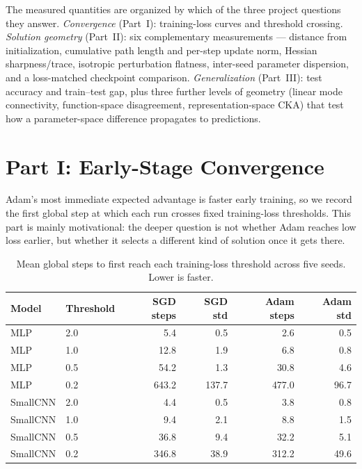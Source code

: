 \documentclass[11pt]{article}
\begin{document}
The measured quantities are organized by which of the three project questions they answer. \emph{Convergence} (Part~I): training-loss curves and threshold crossing. \emph{Solution geometry} (Part~II): six complementary measurements --- distance from initialization, cumulative path length and per-step update norm, Hessian sharpness/trace, isotropic perturbation flatness, inter-seed parameter dispersion, and a loss-matched checkpoint comparison. \emph{Generalization} (Part~III): test accuracy and train--test gap, plus three further levels of geometry (linear mode connectivity, function-space disagreement, representation-space CKA) that test how a parameter-space difference propagates to predictions.

\section{Part I: Early-Stage Convergence}

Adam's most immediate expected advantage is faster early training, so we record the first global step at which each run crosses fixed training-loss thresholds. This part is mainly motivational: the deeper question is not whether Adam reaches low loss earlier, but whether it selects a different kind of solution once it gets there.

\begin{table}[H]
\centering
\begin{tabular}{llrrrr}
\toprule
\textbf{Model} & \textbf{Threshold} & \textbf{SGD steps} & \textbf{SGD std} & \textbf{Adam steps} & \textbf{Adam std}\\
\midrule
MLP & 2.0 & 5.4 & 0.5 & 2.6 & 0.5\\
MLP & 1.0 & 12.8 & 1.9 & 6.8 & 0.8\\
MLP & 0.5 & 54.2 & 1.3 & 30.8 & 4.6\\
MLP & 0.2 & 643.2 & 137.7 & 477.0 & 96.7\\
\midrule
SmallCNN & 2.0 & 4.4 & 0.5 & 3.8 & 0.8\\
SmallCNN & 1.0 & 9.4 & 2.1 & 8.8 & 1.5\\
SmallCNN & 0.5 & 36.8 & 9.4 & 32.2 & 5.1\\
SmallCNN & 0.2 & 346.8 & 38.9 & 312.2 & 49.6\\
\bottomrule
\end{tabular}
\caption{Mean global steps to first reach each training-loss threshold across five seeds. Lower is faster.}
\label{tab:q1_thresholds}
\end{table}
\end{document}
